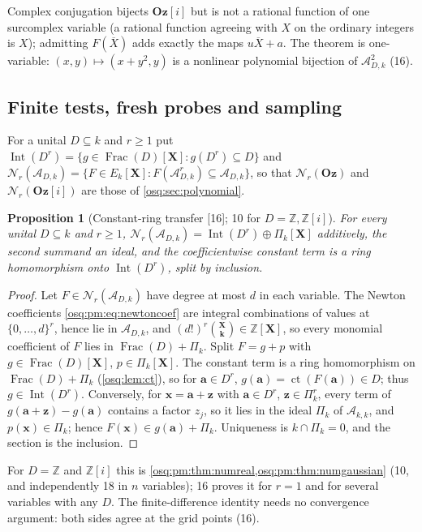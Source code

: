 \documentclass[11pt,letterpaper]{article}
\numberwithin{equation}{section}
\newtheorem{proposition}[proposition]{Proposition}
\theoremstyle{definition}
\theoremstyle{remark}
\theoremstyle{plain}
\newcommand{\Oz}{\mathbf{Oz}}
\newcommand{\GOz}{\Oz[i]}
\newcommand{\Z}{\mathbb Z}
\newcommand{\A}{\mathcal A}          %
\newcommand{\ct}{\operatorname{ct}}
\newcommand{\Frac}{\operatorname{Frac}}
\newcommand{\Int}{\operatorname{Int}}
\newcommand{\Num}{\mathscr N}
\newcommand{\src}[1]{\textup{\textsf{[#1]}}}
\begin{document}
Complex conjugation bijects $\GOz$ but is not a rational function of one surcomplex variable (a rational function agreeing with $X$ on the
ordinary integers is $X$); admitting $F(\overline X)$ adds exactly the maps $u\overline X+a$. The theorem is one-variable:
$(x,y)\mapsto(x+y^2,y)$ is a nonlinear polynomial bijection of $\A_{D,k}^2$ (16).

\subsection{Finite tests, fresh probes and sampling}\label{osq:fs:sub:tests}

For a unital $D\subseteq k$ and $r\ge1$ put $\Int(D^r)=\{g\in\Frac(D)[\mathbf X]:g(D^r)\subseteq D\}$ and
$\Num_r(\A_{D,k})=\{F\in E_k[\mathbf X]:F(\A_{D,k}^r)\subseteq\A_{D,k}\}$, so that $\Num_r(\Oz)$ and $\Num_r(\GOz)$ are those of
\cref{osq:sec:polynomial}.

\begin{proposition}[Constant-ring transfer \src{16}; 10 for {$D=\Z,\Z[i]$}]\label{osq:fs:prop:transfer}
For every unital $D\subseteq k$ and $r\ge1$, $\Num_r(\A_{D,k})=\Int(D^r)\oplus\Pi_k[\mathbf X]$ additively, the second summand an ideal,
and the coefficientwise constant term is a ring homomorphism onto $\Int(D^r)$, split by inclusion.
\end{proposition}
\begin{proof}
Let $F\in\Num_r(\A_{D,k})$ have degree at most $d$ in each variable. The Newton coefficients \eqref{osq:pm:eq:newtoncoef} are integral
combinations of values at $\{0,\dots,d\}^r$, hence lie in $\A_{D,k}$, and $(d!)^r\binom{\mathbf X}{\mathbf k}\in\Z[\mathbf X]$, so every monomial
coefficient of $F$ lies in $\Frac(D)+\Pi_k$. Split $F=g+p$ with $g\in\Frac(D)[\mathbf X]$, $p\in\Pi_k[\mathbf X]$. The constant term is a ring
homomorphism on $\Frac(D)+\Pi_k$ (\cref{osq:lem:ct}), so for $\mathbf a\in D^r$, $g(\mathbf a)=\ct(F(\mathbf a))\in D$; thus $g\in\Int(D^r)$.
Conversely, for $\mathbf x=\mathbf a+\mathbf z$ with $\mathbf a\in D^r$, $\mathbf z\in\Pi_k^r$, every term of $g(\mathbf a+\mathbf z)-g(\mathbf a)$
contains a factor $z_j$, so it lies in the ideal $\Pi_k$ of $\A_{k,k}$, and $p(\mathbf x)\in\Pi_k$; hence $F(\mathbf x)\in g(\mathbf a)+\Pi_k$.
Uniqueness is $k\cap\Pi_k=0$, and the section is the inclusion.
\end{proof}

For $D=\Z$ and $\Z[i]$ this is \cref{osq:pm:thm:numreal,osq:pm:thm:numgaussian} (10, and independently 18 in $n$ variables); 16 proves it for $r=1$ and for several variables with
any $D$. The finite-difference identity needs no convergence argument: both sides agree at the grid points (16).
\end{document}
